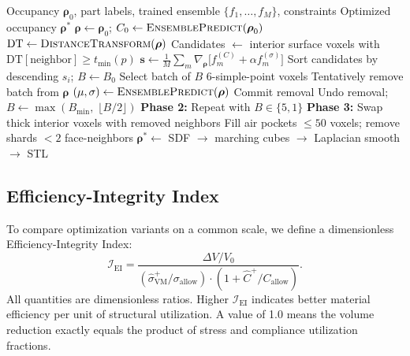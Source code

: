 \documentclass[11pt]{article}
\theoremstyle{plain}
\theoremstyle{definition}
\theoremstyle{remark}
\begin{document}
\begin{algorithm}[t]
\caption{Surrogate-Accelerated Sensitivity Topology Optimization (SASTO)}
\label{alg:sasto}
\begin{algorithmic}[1]
\Require Occupancy $\boldsymbol{\rho}_0$, part labels, trained ensemble $\{f_1,\ldots,f_M\}$, constraints
\Ensure Optimized occupancy $\boldsymbol{\rho}^*$
\State $\boldsymbol{\rho} \gets \boldsymbol{\rho}_0$; $C_0 \gets \textsc{EnsemblePredict}(\boldsymbol{\rho}_0)$
    \State $\mathrm{DT} \gets \textsc{DistanceTransform}(\boldsymbol{\rho})$
    \State Candidates $\gets$ interior surface voxels with $\mathrm{DT}[\text{neighbor}] \geq t_{\min}(p)$
        \State $\mathbf{s} \gets \frac{1}{M}\sum_m \nabla_{\boldsymbol\rho}\bigl[f_m^{(C)} + \alpha f_m^{(\sigma)}\bigr]$
    \EndIf
    \State Sort candidates by descending $s_i$; $B \gets B_0$
        \State Select batch of $B$ 6-simple-point voxels
        \State Tentatively remove batch from $\boldsymbol{\rho}$
        \State $(\mu, \sigma) \gets \textsc{EnsemblePredict}(\boldsymbol{\rho})$
            \State Commit removal
        \Else
            \State Undo removal; $B \gets \max(B_{\min},\;\lfloor B/2 \rfloor)$
        \EndIf
    \EndWhile
\EndFor
\State \textbf{Phase 2:} Repeat with $B \in \{5, 1\}$
\State \textbf{Phase 3:} Swap thick interior voxels with removed neighbors
\State Fill air pockets $\leq 50$ voxels; remove shards $< 2$ face-neighbors
\State $\boldsymbol{\rho}^* \gets$ SDF $\to$ marching cubes $\to$ Laplacian smooth $\to$ STL
\end{algorithmic}
\end{algorithm}

\subsection{Efficiency-Integrity Index}
\label{sec:ei}

To compare optimization variants on a common scale, we define a dimensionless Efficiency-Integrity Index:
\begin{equation}\label{eq:ei}
\mathcal{I}_{\mathrm{EI}} = \frac{\Delta V / V_0}{(\hat{\sigma}^+_{\mathrm{VM}} / \sigma_{\mathrm{allow}}) \cdot (1 + \hat{C}^+ / C_{\mathrm{allow}})}.
\end{equation}
All quantities are dimensionless ratios. Higher $\mathcal{I}_{\mathrm{EI}}$ indicates better material efficiency per unit of structural utilization. A value of 1.0 means the volume reduction exactly equals the product of stress and compliance utilization fractions.
\end{document}
